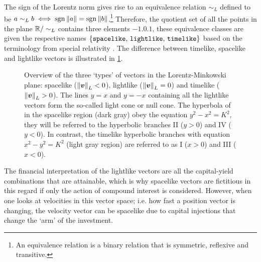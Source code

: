 The sign of the Lorentz norm gives rise to an equivalence relation \(\sim_L\) defined to be \(a \sim_L b \iff \operatorname{sgn}{\norm{a}} = \operatorname{sgn}{\norm{b}}\).\footnote{An equivalence relation is a binary relation that is symmetric, reflexive and transitive.} Therefore, the quotient set of all the points in the plane \(\mathbb{R} / \sim_L \) contains three elements \(\qty{-1, 0, 1}\), these equivalence classes are given the respective names \(\qty{\text{\texttt{spacelike}},\, \text{\texttt{lightlike}},\, \text{\texttt{timelike}}}\) based on the terminology from special relativity \cite{Landau1971}. The difference between timelike, spacelike and lightlike vectors is illustrated in \cref{fig:lightlike_spacelike}.

\begin{figure}[ht]
    \centering
    
    \caption{Overview of the three `types' of vectors in the Lorentz-Minkowski plane: spacelike (\(\norm{\vb*{v}}_L < 0\)), lightlike (\(\norm{\vb*{v}}_L = 0\)) and timelike (\(\norm{\vb*{v}}_L > 0\)). The lines \(y = x\) and \(y = -x\) containing all the lightlike vectors form the so-called light cone or null cone. The hyperbola of in the spacelike region (dark gray) obey the equation \(y^2 - x^2 = K^2\), they will be referred to the hyperbolic branches II (\(y > 0\)) and IV (\(y < 0\)). In contrast, the timelike hyperbolic branches with equation \(x^2 - y^2 = K^2\) (light gray region) are referred to as I (\(x > 0\)) and III (\(x < 0\)).}
    \label{fig:lightlike_spacelike}
\end{figure}
The financial interpretation of the lightlike vectors are all the capital-yield combinations that are attainable, which is why spacelike vectors are fictitious in this regard if only the action of compound interest is considered. However, when one looks at velocities in this vector space; i.e. how fast a position vector is changing, the velocity vector can be spacelike due to capital injections that change the `arm' of the investment. 

